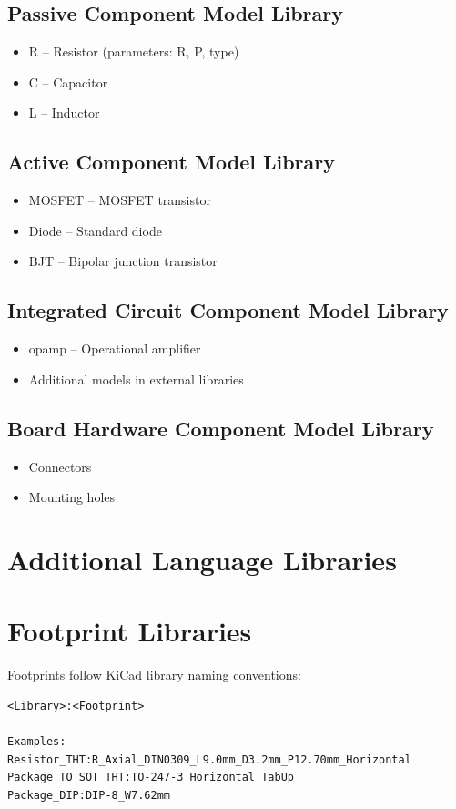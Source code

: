 \documentclass{report}
\begin{document}
\subsection{Passive Component Model Library}
\begin{itemize}
\item R -- Resistor (parameters: R, P, type)
\item C -- Capacitor
\item L -- Inductor
\end{itemize}

\subsection{Active Component Model Library}
\begin{itemize}
\item MOSFET -- MOSFET transistor
\item Diode -- Standard diode
\item BJT -- Bipolar junction transistor
\end{itemize}

\subsection{Integrated Circuit Component Model Library}
\begin{itemize}
\item opamp -- Operational amplifier
\item Additional models in external libraries
\end{itemize}

\subsection{Board Hardware Component Model Library}
\begin{itemize}
\item Connectors
\item Mounting holes
\end{itemize}

\section{Additional Language Libraries}

\section{Footprint Libraries}
Footprints follow KiCad library naming conventions:
\begin{verbatim}
<Library>:<Footprint>

Examples:
Resistor_THT:R_Axial_DIN0309_L9.0mm_D3.2mm_P12.70mm_Horizontal
Package_TO_SOT_THT:TO-247-3_Horizontal_TabUp
Package_DIP:DIP-8_W7.62mm
\end{verbatim}
\end{document}
